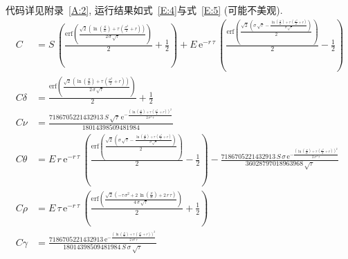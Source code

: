 代码详见附录~\ref{A:2}, 运行结果如式~\ref{E:4}与式~\ref{E:5} (可能不美观).
\begin{equation}\label{E:4}
    \begin{aligned}
        C &= S\,\left(\frac{\mathrm{erf}\left(\frac{\sqrt{2}\,\left(\ln\left(\frac{S}{E}\right)+\tau \,\left(\frac{\sigma ^2}{2}+r\right)\right)}{2\,\sigma \,\sqrt{\tau }}\right)}{2}+\frac{1}{2}\right)+E\,{\mathrm{e}}^{-r\,\tau }\,\left(\frac{\mathrm{erf}\left(\frac{\sqrt{2}\,\left(\sigma \,\sqrt{\tau }-\frac{\ln\left(\frac{S}{E}\right)+\tau \,\left(\frac{\sigma ^2}{2}+r\right)}{\sigma \,\sqrt{\tau }}\right)}{2}\right)}{2}-\frac{1}{2}\right) \\
        C\delta &= \frac{\mathrm{erf}\left(\frac{\sqrt{2}\,\left(\ln\left(\frac{S}{E}\right)+\tau \,\left(\frac{\sigma ^2}{2}+r\right)\right)}{2\,\sigma \,\sqrt{\tau }}\right)}{2}+\frac{1}{2} \\
        C\nu &= \frac{7186705221432913\,S\,\sqrt{\tau }\,{\mathrm{e}}^{-\frac{{\left(\ln\left(\frac{S}{E}\right)+\tau \,\left(\frac{\sigma ^2}{2}+r\right)\right)}^2}{2\,\sigma ^2\,\tau }}}{18014398509481984} \\
        C\theta &= E\,r\,{\mathrm{e}}^{-r\,\tau }\,\left(\frac{\mathrm{erf}\left(\frac{\sqrt{2}\,\left(\sigma \,\sqrt{\tau }-\frac{\ln\left(\frac{S}{E}\right)+\tau \,\left(\frac{\sigma ^2}{2}+r\right)}{\sigma \,\sqrt{\tau }}\right)}{2}\right)}{2}-\frac{1}{2}\right)-\frac{7186705221432913\,S\,\sigma \,{\mathrm{e}}^{-\frac{{\left(\ln\left(\frac{S}{E}\right)+\tau \,\left(\frac{\sigma ^2}{2}+r\right)\right)}^2}{2\,\sigma ^2\,\tau }}}{36028797018963968\,\sqrt{\tau }} \\
        C\rho &= E\,\tau \,{\mathrm{e}}^{-r\,\tau }\,\left(\frac{\mathrm{erf}\left(\frac{\sqrt{2}\,\left(-\tau \,\sigma ^2+2\,\ln\left(\frac{S}{E}\right)+2\,r\,\tau \right)}{4\,\sigma \,\sqrt{\tau }}\right)}{2}+\frac{1}{2}\right) \\
        C\gamma &= \frac{7186705221432913\,{\mathrm{e}}^{-\frac{{\left(\ln\left(\frac{S}{E}\right)+\tau \,\left(\frac{\sigma ^2}{2}+r\right)\right)}^2}{2\,\sigma ^2\,\tau }}}{18014398509481984\,S\,\sigma \,\sqrt{\tau }} \\
    \end{aligned}
\end{equation}

